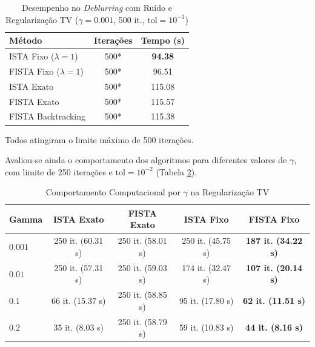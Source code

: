 \documentclass[12pt]{article}
\begin{document}
\begin{table}[H]
    \centering
    \caption{Desempenho no \textit{Deblurring} com Ruído e Regularização TV ($\gamma=0.001$, 500 it., $\text{tol}=10^{-3}$)}
    \label{tab:tv_deblur_results}
    \begin{tabular}{lcc}
        \toprule
        \textbf{Método} & \textbf{Iterações} & \textbf{Tempo (s)} \\
        \midrule
        ISTA Fixo ($\lambda=1$)     & 500* & \textbf{94.38} \\
        FISTA Fixo ($\lambda=1$)    & 500* & 96.51 \\
        ISTA Exato                  & 500* & 115.08 \\
        FISTA Exato                 & 500* & 115.57 \\
        FISTA Backtracking          & 500* & 115.38 \\
        \bottomrule
    \end{tabular}
    
    \vspace{0.1cm}
    {\footnotesize *Todos atingiram o limite máximo de 500 iterações.}
\end{table}

Avaliou-se ainda o comportamento dos algoritmos para diferentes valores de $\gamma$, com limite de 250 iterações e $\text{tol}=10^{-2}$ (Tabela \ref{tab:tv_gammas}).

\begin{table}[H]
    \centering
    \caption{Comportamento Computacional por $\gamma$ na Regularização TV}
    \label{tab:tv_gammas}
    \begin{tabular}{lcccc}
        \toprule
        \textbf{Gamma} & \textbf{ISTA Exato} & \textbf{FISTA Exato} & \textbf{ISTA Fixo} & \textbf{FISTA Fixo} \\
        \midrule
        $0.001$ & 250 it. (60.31 s) & 250 it. (58.01 s) & 250 it. (45.75 s) & \textbf{187 it. (34.22 s)} \\
        $0.01$  & 250 it. (57.31 s) & 250 it. (59.03 s) & 174 it. (32.47 s) & \textbf{107 it. (20.14 s)} \\
        $0.1$   & 66 it. (15.37 s)  & 250 it. (58.85 s) & 95 it. (17.80 s)  & \textbf{62 it. (11.51 s)}  \\
        $0.2$   & 35 it. (8.03 s)   & 250 it. (58.79 s) & 59 it. (10.83 s)  & \textbf{44 it. (8.16 s)}   \\
        \bottomrule
    \end{tabular}
\end{table}
\end{document}
